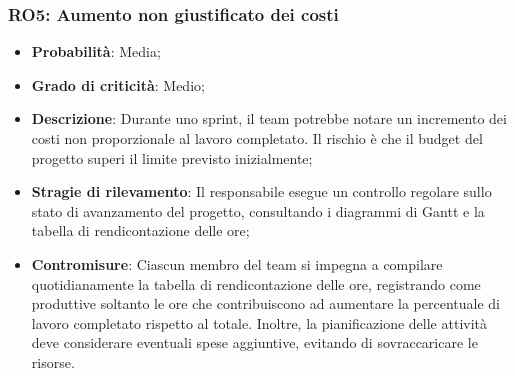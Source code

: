 \subsubsection{RO5: Aumento non giustificato dei costi}
\begin{itemize}
    \item \textbf{Probabilità}: Media;
    \item \textbf{Grado di criticità}: Medio;
    \item \textbf{Descrizione}: Durante uno sprint, il team potrebbe notare un incremento dei costi non proporzionale al lavoro completato. Il rischio è che il budget del progetto superi il limite previsto inizialmente;
    \item \textbf{Stragie di rilevamento}: Il responsabile esegue un controllo regolare sullo stato di avanzamento del progetto, consultando i diagrammi di Gantt e la tabella di rendicontazione delle ore;
    \item \textbf{Contromisure}: Ciascun membro del team si impegna a compilare quotidianamente la tabella di rendicontazione delle ore, registrando come produttive soltanto le ore che contribuiscono ad aumentare la percentuale di lavoro completato rispetto al totale. Inoltre, la pianificazione delle attività deve considerare eventuali spese aggiuntive, evitando di sovraccaricare le risorse.
\end{itemize}
